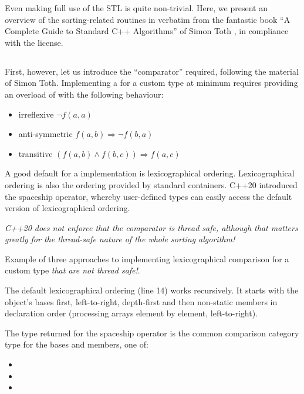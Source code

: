 Even making full use of the STL is quite non-trivial. Here, we present an overview of the sorting-related routines in verbatim from the fantastic book ``A Complete Guide to Standard C++ Algorithms'' of Simon Toth \cite{toth2023}, in compliance with the license. 

\subsection{}

First, however, let us introduce the  ``comparator'' required, following the material of Simon Toth.
Implementing a  for a custom type at minimum requires providing an overload of  with the following behaviour:

\begin{itemize}
    \item irreflexive $\neg f(a,a)$
    \item anti-symmetric $f(a,b) \Rightarrow \neg f(b,a)$
    \item transitive $(f(a,b) \wedge f(b,c)) \Rightarrow f(a,c)$
\end{itemize}

A good default for a  implementation is lexicographical ordering. Lexicographical ordering is also the ordering provided by standard containers.
C++20 introduced the spaceship operator, whereby user-defined types can easily access the default version of lexicographical ordering.

\emph{C++20 does not enforce that the comparator is thread safe, although that matters greatly for the thread-safe nature of the whole sorting algorithm!}

\begin{codebox}[breakable]{\href{https://compiler-explorer.com/z/GvMGhYdos}{\ExternalLink}}
\footnotesize Example of three approaches to implementing lexicographical comparison for a custom type \emph{that are not thread safe!}.
\tcblower
{}
\end{codebox}

The default lexicographical ordering (line 14) works recursively. It starts with the object’s bases first, left-to-right, depth-first and then non-static members in declaration order (processing arrays element by element, left-to-right).

The type returned for the spaceship operator is the common comparison category type for the bases and members, one of:
\begin{itemize}
    \item {}
    \item {}
    \item {}
\end{itemize}

